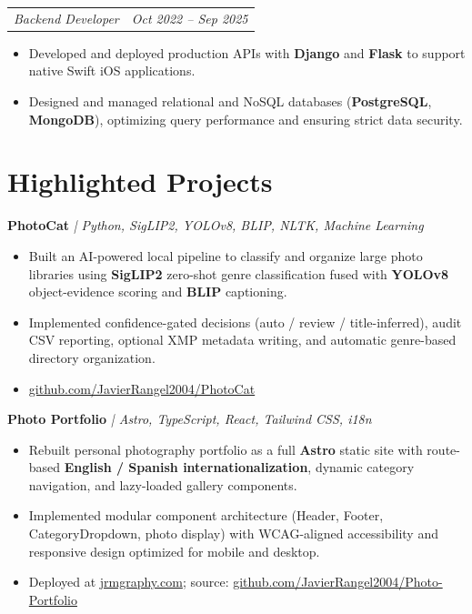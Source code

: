 \documentclass[11pt, letterpaper]{article}
\makeatletter
\newcommand{\entry}[2]{%
  \noindent
  \begin{tabular*}{\textwidth}{@{}l@{\extracolsep{\fill}}r@{}}
    #1 & #2
  \end{tabular*}%
}
\newcommand{\project}[2]{%
  \noindent\textbf{#1} \hspace{4pt} \textit{| #2}%
}
\newenvironment{cvlist}{%
  \begin{itemize}[
    leftmargin=1.4em,
    itemsep=1.5pt,
    topsep=3pt,
    parsep=0pt
  ]
}{%
  \end{itemize}%
}
\makeatother
\begin{document}
\vspace{4pt}

\entry{\textit{Backend Developer}}{\textit{Oct 2022 -- Sep 2025}}

\begin{cvlist}
  \item Developed and deployed production APIs with \textbf{Django} and
        \textbf{Flask} to support native Swift iOS applications.
  \item Designed and managed relational and NoSQL databases
        (\textbf{PostgreSQL}, \textbf{MongoDB}), optimizing query
        performance and ensuring strict data security.
\end{cvlist}

\section{Highlighted Projects}

\project{PhotoCat}%
        {Python, SigLIP2, YOLOv8, BLIP, NLTK, Machine Learning}

\begin{cvlist}
  \item Built an AI-powered local pipeline to classify and organize large
        photo libraries using \textbf{SigLIP2} zero-shot genre
        classification fused with \textbf{YOLOv8} object-evidence scoring
        and \textbf{BLIP} captioning.
  \item Implemented confidence-gated decisions (auto / review /
        title-inferred), audit CSV reporting, optional XMP metadata
        writing, and automatic genre-based directory organization.
  \item \href{https://github.com/JavierRangel2004/PhotoCat}{github.com/JavierRangel2004/PhotoCat}
\end{cvlist}

\vspace{4pt}

\project{Photo Portfolio}%
        {Astro, TypeScript, React, Tailwind CSS, i18n}

\begin{cvlist}
  \item Rebuilt personal photography portfolio as a full
        \textbf{Astro} static site with route-based
        \textbf{English / Spanish internationalization}, dynamic
        category navigation, and lazy-loaded gallery components.
  \item Implemented modular component architecture (Header, Footer,
        CategoryDropdown, photo display) with WCAG-aligned accessibility
        and responsive design optimized for mobile and desktop.
  \item Deployed at \href{https://jrmgraphy.com}{jrmgraphy.com};
        source: \href{https://github.com/JavierRangel2004/Photo-Portfolio}{github.com/JavierRangel2004/Photo-Portfolio}
\end{cvlist}
\end{document}
